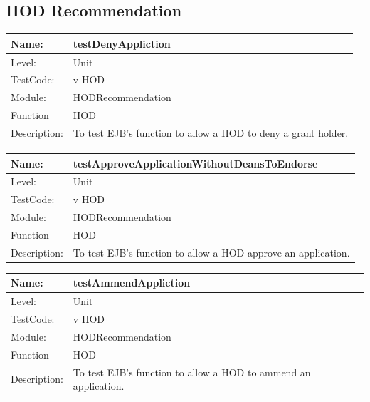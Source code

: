 \documentclass[12pt]{article}
\begin{document}
\subsection{HOD Recommendation}

\begin{center}
\begin{tabular}{|l|p{12cm}|}
\hline

 Name: & testDenyAppliction  \\
\hline
Level: & Unit \\
\hline
TestCode: & v HOD \\
\hline
Module:& HODRecommendation \\
\hline
Function & HOD \\
\hline
Description: & To test EJB's function to allow a HOD to deny a grant holder. \\
\hline
\end{tabular}
\end{center}


\begin{center}
\begin{tabular}{|l|p{12cm}|}
\hline

 Name: & testApproveApplicationWithoutDeansToEndorse  \\
\hline
Level: & Unit \\
\hline
TestCode: & v HOD \\
\hline
Module:& HODRecommendation \\
\hline
Function & HOD \\
\hline
Description: & To test EJB's function to allow a HOD approve an application. \\
\hline
\end{tabular}
\end{center}


\begin{center}
\begin{tabular}{|l|p{12cm}|}
\hline

 Name: & testAmmendAppliction  \\
\hline
Level: & Unit \\
\hline
TestCode: & v HOD \\
\hline
Module:& HODRecommendation \\
\hline
Function & HOD \\
\hline
Description: & To test EJB's function to allow a HOD to ammend an application. \\
\hline
\end{tabular}
\end{center}
\end{document}
